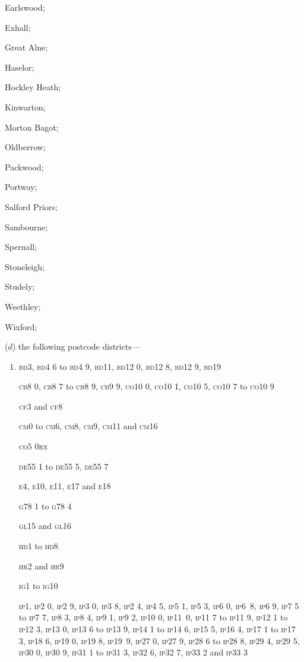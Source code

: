 \documentclass[12pt,a4paper]{article}
\begin{document}
\begin{enumerate}
\begin{enumerate}
    Earlswood;

    Exhall;

    Great Alne;

    Haselor;

    Hockley Heath;

    Kinwarton;

    Morton Bagot;

    Oldberrow;

    Packwood;

    Portway;

    Salford Priors;

    Sambourne;

    Spernall;

    Stoneleigh;

    Studely;

    Weethley;

    Wixford; 
\end{enumerate}

($d$) the following postcode districts—

\newcommand\postcode[1]{\textsc{\lowercase{#1}}}

\begin{enumerate}\item[]
    \postcode{BD3}, \postcode{BD4 6} to \postcode{BD4 9, BD11, BD12 0, BD12 8, BD12 9, BD19}

    \postcode{CB8 0, CB8 7} to \postcode{CB8 9, CB9 9, CO10 0, CO10 1, CO10 5, CO10 7} to \postcode{CO10 9}

    \postcode{CF3} and \postcode{CF8}

    \postcode{CM0} to \postcode{CM6, CM8, CM9, CM11} and \postcode{CM16}

    \postcode{CO5 0RX}

    \postcode{DE55 1} to \postcode{DE55 5, DE55 7}

    \postcode{E4, E10, E11, E17} and \postcode{E18}

    \postcode{G78 1} to \postcode{G78 4}

    \postcode{GL15} and \postcode{GL16}

    \postcode{HD1} to \postcode{HD8}

    \postcode{HR2} and \postcode{HR9}

    \postcode{IG1} to \postcode{IG10}

    \postcode{IP1, IP2 0, IP2 9, IP3 0, IP3 8, IP2 4, IP4 5, IP5 1, IP5 3, IP6 0, IP6~8, IP6 9, IP7 5} to \postcode{IP7 7, IP8 3, IP8 4, IP9 1, IP9 2, IP10 0, IP11~0, IP11 7} to \postcode{IP11 9, IP12 1} to \postcode{IP12 3, IP13 0, IP13 6} to \postcode{IP13 9, IP14 1} to \postcode{IP14 6, IP15 5, IP16 4, IP17 1} to \postcode{IP17 3, IP18 6, IP19 0, IP19 8, IP19~9, IP27 0, IP27 9, IP28 6} to \postcode{IP28 8, IP29 4, IP29 5, IP30 0, IP30 9, IP31 1} to \postcode{IP31 3, IP32 6, IP32 7, IP33 2} and \postcode{IP33 3}


\end{enumerate}
\end{enumerate}
\end{document}
